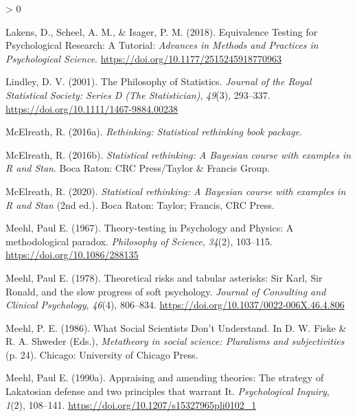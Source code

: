 \documentclass[
  a4paper,11pt,twoside,onecolumn,openright,final,oldfontcommands]{memoir}
\newlength{\cslhangindent}
\newenvironment{CSLReferences}[2] %
 {%
  \setlength{\parindent}{0pt}
  \ifodd #1 \everypar{\setlength{\hangindent}{\cslhangindent}}\ignorespaces\fi
  \ifnum #2 > 0
  \setlength{\parskip}{#2\baselineskip}
  \fi
 }%
 {}
\theoremstyle{definition}
\theoremstyle{definition}
\theoremstyle{definition}
\theoremstyle{remark}
\begin{document}
\begin{CSLReferences}{1}{0}
\leavevmode\hypertarget{ref-lakens_equivalence_2018}{}%
Lakens, D., Scheel, A. M., \& Isager, P. M. (2018). Equivalence {Testing} for {Psychological} {Research}: {A} {Tutorial}: \emph{Advances in Methods and Practices in Psychological Science}. \url{https://doi.org/10.1177/2515245918770963}

\leavevmode\hypertarget{ref-lindley_philosophy_2001}{}%
Lindley, D. V. (2001). The {Philosophy} of {Statistics}. \emph{Journal of the Royal Statistical Society: Series D (The Statistician)}, \emph{49}(3), 293--337. \url{https://doi.org/10.1111/1467-9884.00238}

\leavevmode\hypertarget{ref-R-rethinking}{}%
McElreath, R. (2016a). \emph{Rethinking: Statistical rethinking book package}.

\leavevmode\hypertarget{ref-mcelreath_statistical_2016}{}%
McElreath, R. (2016b). \emph{Statistical rethinking: A {Bayesian} course with examples in {R} and {Stan}}. Boca Raton: CRC Press/Taylor \& Francis Group.

\leavevmode\hypertarget{ref-mcelreath_statistical_2020}{}%
McElreath, R. (2020). \emph{Statistical rethinking: A {Bayesian} course with examples in {R} and {Stan}} (2nd ed.). Boca Raton: Taylor; Francis, CRC Press.

\leavevmode\hypertarget{ref-meehl_theory-testing_1967}{}%
Meehl, Paul E. (1967). Theory-testing in {Psychology} and {Physics}: {A} methodological paradox. \emph{Philosophy of Science}, \emph{34}(2), 103--115. \url{https://doi.org/10.1086/288135}

\leavevmode\hypertarget{ref-meehl_theoretical_1978}{}%
Meehl, Paul E. (1978). Theoretical risks and tabular asterisks: {Sir} {Karl}, {Sir} {Ronald}, and the slow progress of soft psychology. \emph{Journal of Consulting and Clinical Psychology}, \emph{46}(4), 806--834. \url{https://doi.org/10.1037/0022-006X.46.4.806}

\leavevmode\hypertarget{ref-meehl_what_1986}{}%
Meehl, P. E. (1986). What {Social} {Scientists} {Don}'t {Understand}. In D. W. Fiske \& R. A. Shweder (Eds.), \emph{Metatheory in social science: {Pluralisms} and subjectivities} (p. 24). Chicago: University of Chicago Press.

\leavevmode\hypertarget{ref-meehl_appraising_1990}{}%
Meehl, Paul E. (1990a). Appraising and amending theories: {The} strategy of {Lakatosian} defense and two principles that warrant {It}. \emph{Psychological Inquiry}, \emph{1}(2), 108--141. \url{https://doi.org/10.1207/s15327965pli0102_1}


\end{CSLReferences}
\end{document}
